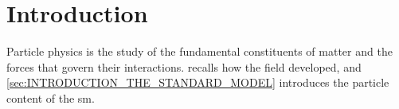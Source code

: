 \documentclass[../../thesis.tex]{subfiles}
\begin{document}
\chapter{Introduction}
\label{sec:INTRODUCTION}

\chaptertitleblock
  {\QuoteChI}
  {\AttribChI}
  {Particle physics is the study of the fundamental constituents of matter and the forces that govern their interactions.  recalls how the field developed, and \cref{sec:INTRODUCTION_THE_STANDARD_MODEL} introduces the particle content of the \gls{sm}.}

\clearpage



\end{document}
